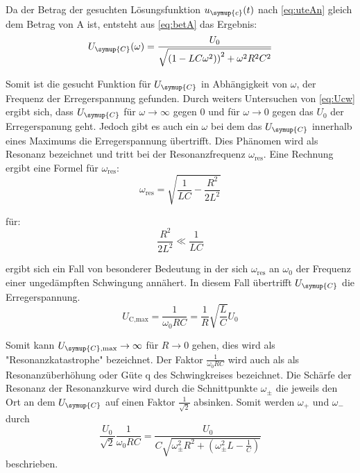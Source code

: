     \noindent Da der Betrag der gesuchten Lösungsfunktion $u_{\symup{c}}(t)$ nach \ref{eq:uteAn} gleich dem Betrag von A ist, entsteht aus 
    \ref{eq:betA} das Ergebnis:
    \begin{equation}
        U_{\symup{C}}(\omega) = \frac{U_0}{\sqrt{\left(1-LC\omega^2)\right)^2 + \omega^2 R^2 C^2}} 
        \label{eq:Ucw}
    \end{equation}

    \noindent Somit ist die gesucht Funktion für $U_{\symup{C}}$ in Abhängigkeit von $\omega$, der Frequenz der Erregerspannung gefunden. Durch 
    weiters Untersuchen von \ref{eq:Ucw} ergibt sich, dass $U_{\symup{C}}$ für $\omega \to \infty $ gegen 0 und für $\omega \to 0$ gegen 
    das $U_0$ der Erregerspanung geht. Jedoch gibt es auch ein $\omega$ bei dem das $U_{\symup{C}}$ innerhalb eines Maximums die 
    Erregerspannung übertrifft. Dies Phänomen wird als Resonanz bezeichnet und tritt bei der Resonanzfrequenz $\omega_{\text{res}}$. 
    Eine Rechnung ergibt eine Formel für $\omega_{\text{res}}$:
    \begin{equation}
        \omega_{\text{res}} = \sqrt{\frac{1}{LC}-\frac{R^2}{2L^2}} \nonumber
    \end{equation}

    für: 
    \begin{equation}
        \frac{R^2}{2L^2} \ll \frac{1}{LC} \nonumber
    \end{equation}

    \noindent ergibt sich ein Fall von besonderer Bedeutung in der sich $\omega_{\text{res}}$ an $\omega_0$ der Frequenz einer ungedämpften 
    Schwingung annähert. In diesem Fall übertrifft $U_{\symup{C}}$ die Erregerspannung.
    \begin{equation}
        U_{\text{C,max}} = \frac{1}{\omega_0 RC} = \frac{1}{R} \sqrt{\frac{L}{C}} U_0 \nonumber
    \end{equation}

    \noindent Somit kann $U_{\symup{C},\text{max}} \to \infty$ für $R \to 0$ gehen, dies wird als "Resonanzkatastrophe" bezeichnet. Der Faktor
    $\frac{1}{\omega_0 RC}$ wird auch als als Resonanzüberhöhung oder Güte q des Schwingkreises bezeichnet. Die Schärfe der Resonanz 
    der Resonanzkurve wird durch die Schnittpunkte $\omega_{\pm}$ die jeweils den Ort an dem $U_{\symup{C}}$ auf einen Faktor $\frac{1}{\sqrt{2}}$ 
    absinken. Somit werden $\omega_+$ und $\omega_-$ durch 
    \begin{equation}
        \frac{U_0}{\sqrt{2}} \frac{1}{\omega_0 RC} = \frac{U_0}{C \sqrt{\omega^2_{\pm} R^2 + \left( \omega^2_{\pm}L - \frac{1}{C} \right) }} \nonumber
    \end{equation}
    beschrieben.

